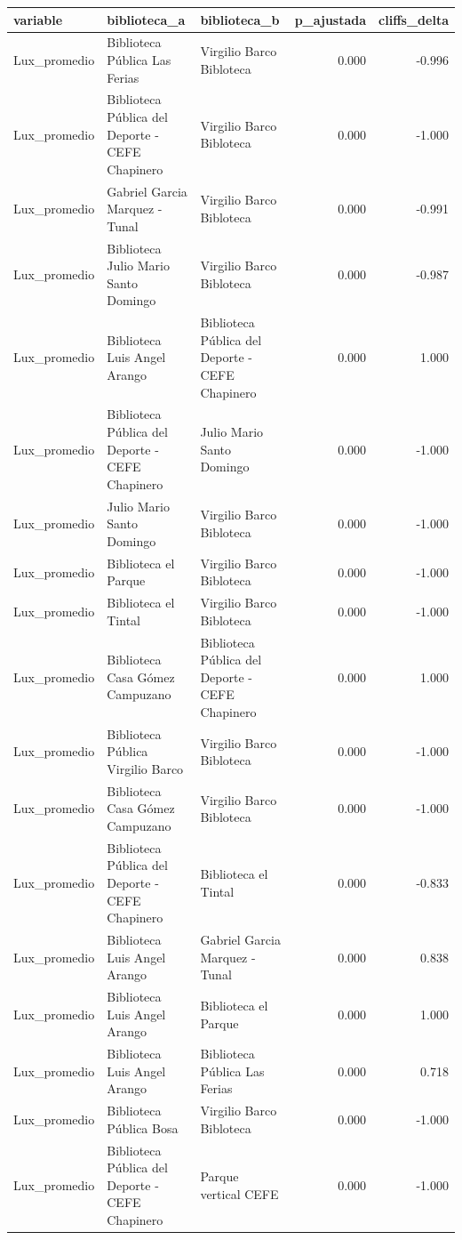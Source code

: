 \begin{tabular}{lllrr}
\toprule
variable & biblioteca\_a & biblioteca\_b & p\_ajustada & cliffs\_delta \\
\midrule
Lux\_promedio & Biblioteca Pública Las Ferias & Virgilio Barco Bibloteca & 0.000 & -0.996 \\
Lux\_promedio & Biblioteca Pública del Deporte - CEFE Chapinero & Virgilio Barco Bibloteca & 0.000 & -1.000 \\
Lux\_promedio & Gabriel Garcia Marquez - Tunal & Virgilio Barco Bibloteca & 0.000 & -0.991 \\
Lux\_promedio & Biblioteca Julio Mario Santo Domingo & Virgilio Barco Bibloteca & 0.000 & -0.987 \\
Lux\_promedio & Biblioteca Luis Angel Arango & Biblioteca Pública del Deporte - CEFE Chapinero & 0.000 & 1.000 \\
Lux\_promedio & Biblioteca Pública del Deporte - CEFE Chapinero & Julio Mario Santo Domingo & 0.000 & -1.000 \\
Lux\_promedio & Julio Mario Santo Domingo & Virgilio Barco Bibloteca & 0.000 & -1.000 \\
Lux\_promedio & Biblioteca el Parque & Virgilio Barco Bibloteca & 0.000 & -1.000 \\
Lux\_promedio & Biblioteca el Tintal & Virgilio Barco Bibloteca & 0.000 & -1.000 \\
Lux\_promedio & Biblioteca Casa Gómez Campuzano & Biblioteca Pública del Deporte - CEFE Chapinero & 0.000 & 1.000 \\
Lux\_promedio & Biblioteca Pública Virgilio Barco & Virgilio Barco Bibloteca & 0.000 & -1.000 \\
Lux\_promedio & Biblioteca Casa Gómez Campuzano & Virgilio Barco Bibloteca & 0.000 & -1.000 \\
Lux\_promedio & Biblioteca Pública del Deporte - CEFE Chapinero & Biblioteca el Tintal & 0.000 & -0.833 \\
Lux\_promedio & Biblioteca Luis Angel Arango & Gabriel Garcia Marquez - Tunal & 0.000 & 0.838 \\
Lux\_promedio & Biblioteca Luis Angel Arango & Biblioteca el Parque & 0.000 & 1.000 \\
Lux\_promedio & Biblioteca Luis Angel Arango & Biblioteca Pública Las Ferias & 0.000 & 0.718 \\
Lux\_promedio & Biblioteca Pública Bosa & Virgilio Barco Bibloteca & 0.000 & -1.000 \\
Lux\_promedio & Biblioteca Pública del Deporte - CEFE Chapinero & Parque vertical CEFE & 0.000 & -1.000 \\

\end{tabular}

